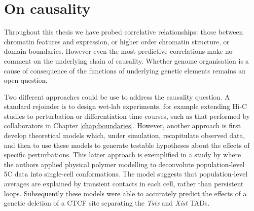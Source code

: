 \documentclass[a4paper,11pt,oneside]{book}
\begin{document}
\section{On causality}


Throughout this thesis we have probed correlative relationships: those between chromatin features and expression, or higher order chromatin structure, or domain boundaries. However even the most predictive correlations make no comment on the underlying chain of causality. Whether genome organisation is a cause of consequence of the functions of underlying genetic elements remains an open question.\cite{Sexton2015}


Two different approaches could be use to address the causality question. A standard rejoinder is to design wet-lab experiments, for example extending Hi-C studies to perturbation or differentiation time courses, such as that performed by collaborators in Chapter \ref{chap:boundaries}. However, another approach is first develop theoretical models which, under simulation, recapitulate observed data, and then to use these models to generate testable hypotheses about the effects of specific perturbations. This latter approach is exemplified in a study by \citet{Giorgetti2014a} where the authors applied physical polymer modelling to deconvolute population-level 5C data into single-cell conformations. The model suggests that population-level averages are explained by transient contacts in each cell, rather than persistent loops. Subsequently these models were able to accurately predict the effects of a genetic deletion of a CTCF site separating the \emph{Tsix} and \emph{Xist} TADs.\cite{Giorgetti2014a} 
\end{document}
